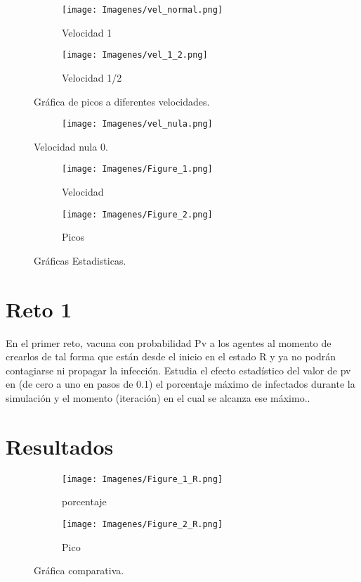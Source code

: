 \documentclass{article}
\begin{document}
\begin{figure}[H]
\centering
\begin{subfigure}[Absoluto]{0.40\linewidth}
\texttt{[image: Imagenes/vel\_normal.png]}
\caption{Velocidad 1 }
\end{subfigure}
\begin{subfigure}[Cuadrado]{0.40\linewidth}
\texttt{[image: Imagenes/vel\_1\_2.png]}
\caption{Velocidad 1/2}
\end{subfigure}
\caption{Gráfica de picos a diferentes velocidades.}
\label{fig:westminster}
\end{figure}

\begin{figure}[H]
\centering
\begin{subfigure}[b]{0.50\linewidth}
\texttt{[image: Imagenes/vel\_nula.png]}
\end{subfigure}
\caption{Velocidad nula 0.}
\label{fig:westminster}
\end{figure}

\begin{figure}[H]
\centering
\begin{subfigure}[Absoluto]{0.40\linewidth}
\texttt{[image: Imagenes/Figure\_1.png]}
\caption{Velocidad}
\end{subfigure}
\begin{subfigure}[Cuadrado]{0.40\linewidth}
\texttt{[image: Imagenes/Figure\_2.png]}
\caption{Picos}
\end{subfigure}
\caption{Gráficas Estadisticas.}
\label{fig:westminster}
\end{figure}

\newpage
\section{Reto 1}
En el primer reto, vacuna con probabilidad 
 P{v} a los agentes al momento de crearlos de tal forma que están desde el inicio en el estado R y ya no podrán contagiarse ni propagar la infección. Estudia el efecto estadístico del valor de p{v} en (de cero a uno en pasos de 0.1) el porcentaje máximo de infectados durante la simulación y el momento (iteración) en el cual se alcanza ese máximo..

 
\section{Resultados}
 \begin{figure}[H]
\centering
\begin{subfigure}[b]{0.50\linewidth}
\texttt{[image: Imagenes/Figure\_1\_R.png]}
\caption{porcentaje}
\end{subfigure}
\begin{subfigure}[b]{0.50\linewidth}
\texttt{[image: Imagenes/Figure\_2\_R.png]}
\caption{Pico}
\end{subfigure}
\caption{Gráfica comparativa.}
\label{fig:westminster}
\end{figure}
\end{document}
